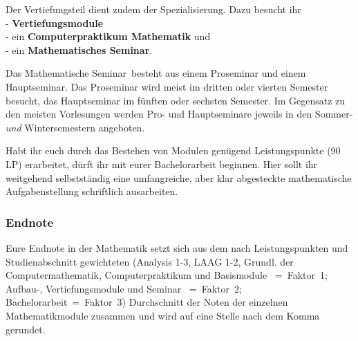 Der Vertiefungsteil dient zudem der Spezialisierung.
Dazu besucht ihr\\
  - {\bf Vertiefungsmodule}\\
  - ein {\bf Computerpraktikum Mathematik} und\\
  - ein {\bf Mathematisches Seminar}.

Das \glqq Mathematische Seminar\grqq\ 
besteht aus einem Proseminar und einem Hauptseminar.
Das Proseminar wird meist im dritten oder vierten Semester besucht,
das Hauptseminar im fünften oder sechsten Semester.
Im Gegensatz zu den meisten Vorlesungen
werden Pro- und Hauptseminare jeweils
in den Sommer- {\it und} Wintersemestern angeboten.

Habt ihr euch durch das Bestehen von Modulen
genügend Leistungspunkte (90 LP) erarbeitet,
dürft ihr mit eurer Bachelorarbeit beginnen.
Hier sollt ihr weitgehend selbstständig
eine umfangreiche, aber klar abgesteckte
mathematische Aufgabenstellung schriftlich ausarbeiten.

\subsubsection{Endnote}

Eure Endnote in der Mathematik
setzt sich aus dem nach Leistungspunkten
und Studienabschnitt gewichteten (Analysis 1-3, LAAG 1-2,
Grundl. der Computermathematik, Computerpraktikum und Basismodule ~=~Faktor~1; \\
Aufbau-, Vertiefungsmodule und Seminar ~=~Faktor~2; Bachelorarbeit~=~Faktor~3)
Durchschnitt der Noten der einzelnen Mathematikmodule zusammen
und wird auf eine Stelle nach dem Komma gerundet.


